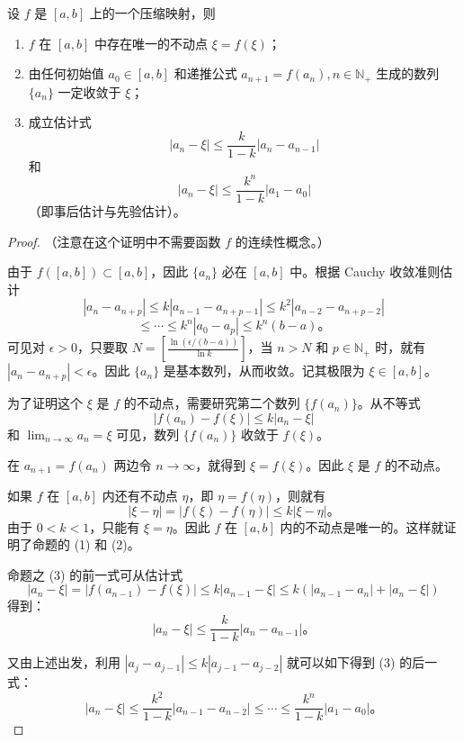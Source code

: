 \documentclass[lang=cn,12pt]{elegantbook}
\begin{document}
\begin{theorem}[压缩映射原理]
设 \( f \) 是 \([a, b]\) 上的一个压缩映射，则
\begin{enumerate}
    \item \( f \) 在 \([a, b]\) 中存在唯一的不动点 \(\xi = f(\xi)\)；
    \item 由任何初始值 \( a_0 \in [a, b] \) 和递推公式 \( a_{n+1} = f(a_n), n \in \mathbb{N}_+ \) 生成的数列 \(\{a_n\}\) 一定收敛于 \(\xi\)；
    \item 成立估计式 
    \[
    |a_n - \xi| \leq \frac{k}{1-k} |a_n - a_{n-1}|
    \]
    和
    \[
    |a_n - \xi| \leq \frac{k^n}{1-k} |a_1 - a_0|
    \]
    （即事后估计与先验估计）。
\end{enumerate}
\end{theorem}

\begin{proof}
（注意在这个证明中不需要函数 \( f \) 的连续性概念。）

由于 \( f([a, b]) \subset [a, b] \)，因此 \(\{a_n\}\) 必在 \([a, b]\) 中。根据 Cauchy 收敛准则估计
\[
|a_n - a_{n+p}| \leq k |a_{n-1} - a_{n+p-1}| \leq k^2 |a_{n-2} - a_{n+p-2}| 
\]
\[
\leq \cdots \leq k^n |a_0 - a_p| \leq k^n (b-a)。
\]
可见对 \(\epsilon > 0\)，只要取 \(N = \left[ \frac{\ln (\epsilon / (b-a))}{\ln k} \right]\)，当 \(n > N\) 和 \(p \in \mathbb{N}_+\) 时，就有 \(|a_n - a_{n+p}| < \epsilon\)。因此 \(\{a_n\}\) 是基本数列，从而收敛。记其极限为 \(\xi \in [a, b]\)。

为了证明这个 \(\xi\) 是 \(f\) 的不动点，需要研究第二个数列 \(\{f(a_n)\}\)。从不等式 
\[
|f(a_n) - f(\xi)| \leq k |a_n - \xi|
\]
和 \(\lim_{n \to \infty} a_n = \xi\) 可见，数列 \(\{f(a_n)\}\) 收敛于 \(f(\xi)\)。

在 \(a_{n+1} = f(a_n)\) 两边令 \(n \to \infty\)，就得到 \(\xi = f(\xi)\)。因此 \(\xi\) 是 \(f\) 的不动点。

如果 \(f\) 在 \([a, b]\) 内还有不动点 \(\eta\)，即 \(\eta = f(\eta)\)，则就有 
\[
|\xi - \eta| = |f(\xi) - f(\eta)| \leq k |\xi - \eta|。
\]
由于 \(0 < k < 1\)，只能有 \(\xi = \eta\)。因此 \(f\) 在 \([a, b]\) 内的不动点是唯一的。这样就证明了命题的 (1) 和 (2)。

命题之 (3) 的前一式可从估计式
\[
|a_n - \xi| = |f(a_{n-1}) - f(\xi)| \leq k |a_{n-1} - \xi| \leq k (|a_{n-1} - a_n| + |a_n - \xi|)
\]
得到：
\[
|a_n - \xi| \leq \frac{k}{1-k} |a_n - a_{n-1}|。
\]

又由上述出发，利用 \(|a_j - a_{j-1}| \leq k |a_{j-1} - a_{j-2}|\) 就可以如下得到 (3) 的后一式：
\[
|a_n - \xi| \leq \frac{k^2}{1-k} |a_{n-1} - a_{n-2}| \leq \cdots \leq \frac{k^n}{1-k} |a_1 - a_0|。
\]
\end{proof}
\end{document}
